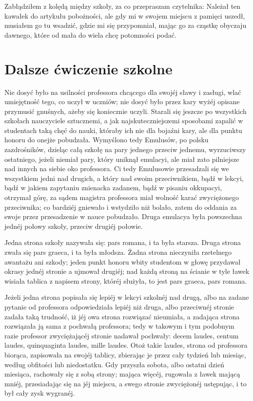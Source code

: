 \documentclass{book}
\begin{document}
Zabłądziłem z kolędą między szkoły, za co przepraszam czytelnika: Należał ten kawałek do artykułu pobożności, ale gdy mi w swojem miejscu z pamięci uszedł, musiałem go tu wsadzić, gdzie mi się przypomniał, mając go za cząstkę obyczaju dawnego, które od mała do wiela chcę potomności podać.

\section{Dalsze ćwiczenie szkolne}

Nie dosyć było na usilności professora chcącego dla swojéj sławy i zasługi, wlać umiejętność tego, co uczył w uczniów; nie dosyć było przez kary wyżéj opisane przymusić gnuśnych, ażeby się koniecznie uczyli. Starali się jeszcze po wszystkich szkołach nauczyciele sztucznemi, a jak najskuteczniejszemi sposobami zapalić w studentach taką chęć do nauki, któraby ich nie dla bojaźni kary, ale dla punktu honoru do onejże pobudzała. Wymyślono tedy Emulusów, po polsku zazdrośników, dzieląc całą szkołę na pary jednego przeciw jednemu, wyrzuciwszy ostatniego, jeżeli niemiał pary, który uniknął emulacyi, ale miał zato pilniejsze nad innych na siebie oko professora. Ci tedy Emulusowie przesadzali się we wszystkiem jedni nad drugich, a który nad swoim przeciwnikiem, bądź w lekcyi, bądź w jakiem zapytaniu znienacka zadanem, bądź w pisaniu okkupacyi, otrzymał górę, za sądem magistra professora miał wolność karać zwyciężonego przeciwnika; co bardziéj gniewało i wstydziło niż bolało, zatem do oddania za swoje przez przesadzenie w nauce pobudzało. Druga emulacya była powszechna jednéj połowy szkoły, przeciw drugiéj połowie.

Jedna strona szkoły nazywała się: pars romana, i ta była starsza. Druga strona zwała się pars graeca, i ta była młodsza. Żadna strona nieczyniła rzetelnego awantażu ani szkody; jeden punkt honoru wbity studentom w głowę przydawał okrasy jednéj stronie a ujmował drugiéj; nad każdą stroną na ścianie w tyle ławek wisiała tablica z napisem strony, któréj służyła, to jest pars graeca, pars romana.

Jeżeli jedna strona popisała się lepiéj w lekcyi szkolnéj nad drugą, albo na zadane pytanie od professora odpowiedziała lepiéj niż druga, albo przeciwnéj stronie zadała taką trudność, iż jéj owa strona rozwiązać nieumiała, a zadająca strona rozwiązała ją sama z pochwałą professora; tedy w takowym i tym podobnym razie professor zwyciężającéj stronie nadawał pochwały: decem laudes, centum laudes, quinquaginta laudes, mille laudes. Otoż takie laudes, strona od professora biorąca, zapisowała na swojéj tablicy, zbierając je przez cały tydzień lub miesiąc, według obfitości lub niedostatku. Gdy przyszła sobota, albo ostatni dzień miesiąca, rachowały się z sobą strony; mająca więcéj, rugowała z ławek mającą mniéj, przesiadając się na jéj miejscu, a swego stronie zwyciężonéj ustępując, i to był cały zysk wygranéj.
\end{document}
